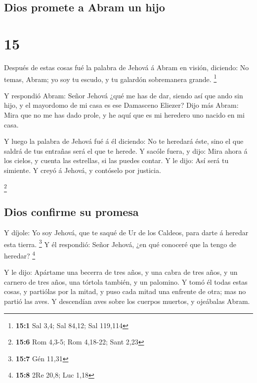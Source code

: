 \hypertarget{dios-promete-a-abram-un-hijo}{%
\subsection{Dios promete a Abram un
hijo}\label{dios-promete-a-abram-un-hijo}}

\hypertarget{section-14}{%
\section{15}\label{section-14}}

 Después de estas cosas fué la palabra de Jehová á Abram
en visión, diciendo: No temas, Abram; yo soy tu escudo, y tu galardón
sobremanera grande. \footnote{\textbf{15:1} Sal 3,4; Sal 84,12; Sal
  119,114}

 Y respondió Abram: Señor Jehová ¿qué me has de dar,
siendo así que ando sin hijo, y el mayordomo de mi casa es ese Damasceno
Eliezer?  Dijo más Abram: Mira que no me has dado prole, y
he aquí que es mi heredero uno nacido en mi casa.

 Y luego la palabra de Jehová fué á él diciendo: No te
heredará éste, sino el que saldrá de tus entrañas será el que te herede.
 Y sacóle fuera, y dijo: Mira ahora á los cielos, y cuenta
las estrellas, si las puedes contar. Y le dijo: Así será tu simiente.
 Y creyó á Jehová, y contóselo por justicia.

\footnote{\textbf{15:6} Rom 4,3-5; Rom 4,18-22; Sant 2,23}

\hypertarget{dios-confirme-su-promesa}{%
\subsection{Dios confirme su promesa}\label{dios-confirme-su-promesa}}

 Y díjole: Yo soy Jehová, que te saqué de Ur de los
Caldeos, para darte á heredar esta tierra. \footnote{\textbf{15:7} Gén
  11,31}  Y él respondió: Señor Jehová, ¿en qué conoceré
que la tengo de heredar? \footnote{\textbf{15:8} 2Re 20,8; Luc 1,18}

 Y le dijo: Apártame una becerra de tres años, y una cabra
de tres años, y un carnero de tres años, una tórtola también, y un
palomino.  Y tomó él todas estas cosas, y partiólas por
la mitad, y puso cada mitad una enfrente de otra; mas no partió las
aves.  Y descendían aves sobre los cuerpos muertos, y
ojeábalas Abram.

